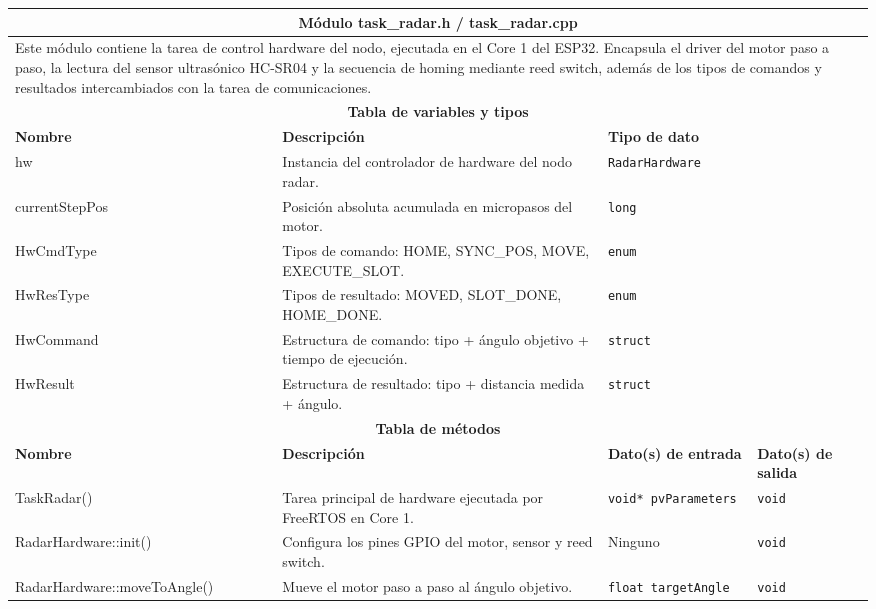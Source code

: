 \begin{table}[h!]
\centering
\small
\renewcommand{\arraystretch}{1.25}
\begin{tabular}{|p{2.8cm}|p{5.5cm}|p{2.8cm}|p{1.7cm}|}
\hline
\multicolumn{4}{|c|}{\textbf{Módulo task\_radar.h / task\_radar.cpp}} \\
\hline
\multicolumn{4}{|p{12.8cm}|}{Este módulo contiene la tarea de control hardware del
nodo, ejecutada en el Core 1 del ESP32. Encapsula el driver del motor paso a paso,
la lectura del sensor ultrasónico HC-SR04 y la secuencia de homing mediante reed
switch, además de los tipos de comandos y resultados intercambiados con la tarea
de comunicaciones.} \\
\hline
\multicolumn{4}{|c|}{\textbf{Tabla de variables y tipos}} \\
\hline
\textbf{Nombre} & \textbf{Descripción} & \multicolumn{2}{l|}{\textbf{Tipo de dato}} \\
\hline
hw & Instancia del controlador de hardware del nodo radar. & \multicolumn{2}{l|}{\texttt{RadarHardware}} \\
\hline
currentStepPos & Posición absoluta acumulada en micropasos del motor. & \multicolumn{2}{l|}{\texttt{long}} \\
\hline
HwCmdType & Tipos de comando: HOME, SYNC\_POS, MOVE, EXECUTE\_SLOT. & \multicolumn{2}{l|}{\texttt{enum}} \\
\hline
HwResType & Tipos de resultado: MOVED, SLOT\_DONE, HOME\_DONE. & \multicolumn{2}{l|}{\texttt{enum}} \\
\hline
HwCommand & Estructura de comando: tipo + ángulo objetivo + tiempo de ejecución. & \multicolumn{2}{l|}{\texttt{struct}} \\
\hline
HwResult & Estructura de resultado: tipo + distancia medida + ángulo. & \multicolumn{2}{l|}{\texttt{struct}} \\
\hline
\multicolumn{4}{|c|}{\textbf{Tabla de métodos}} \\
\hline
\textbf{Nombre} & \textbf{Descripción} & \textbf{Dato(s) de entrada} & \textbf{Dato(s) de salida} \\
\hline
TaskRadar() & Tarea principal de hardware ejecutada por FreeRTOS en Core 1. & \texttt{void* pvParameters} & \texttt{void} \\
\hline
RadarHardware::init() & Configura los pines GPIO del motor, sensor y reed switch. & Ninguno & \texttt{void} \\
\hline
RadarHardware::moveToAngle() & Mueve el motor paso a paso al ángulo objetivo. & \texttt{float targetAngle} & \texttt{void} \\

\end{tabular}
\end{table}
